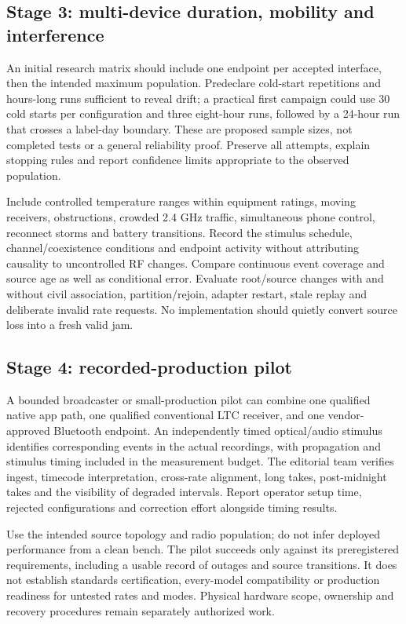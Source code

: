 \documentclass[11pt,letterpaper]{article}
\begin{document}
\subsection{Stage 3: multi-device duration, mobility and interference}
An initial research matrix should include one endpoint per accepted interface, then the intended maximum population. Predeclare cold-start repetitions and hours-long runs sufficient to reveal drift; a practical first campaign could use 30 cold starts per configuration and three eight-hour runs, followed by a 24-hour run that crosses a label-day boundary. These are proposed sample sizes, not completed tests or a general reliability proof. Preserve all attempts, explain stopping rules and report confidence limits appropriate to the observed population.

Include controlled temperature ranges within equipment ratings, moving receivers, obstructions, crowded 2.4 GHz traffic, simultaneous phone control, reconnect storms and battery transitions. Record the stimulus schedule, channel/coexistence conditions and endpoint activity without attributing causality to uncontrolled RF changes. Compare continuous event coverage and source age as well as conditional error. Evaluate root/source changes with and without civil association, partition/rejoin, adapter restart, stale replay and deliberate invalid rate requests. No implementation should quietly convert source loss into a fresh valid jam.

\subsection{Stage 4: recorded-production pilot}
A bounded broadcaster or small-production pilot can combine one qualified native app path, one qualified conventional LTC receiver, and one vendor-approved Bluetooth endpoint. An independently timed optical/audio stimulus identifies corresponding events in the actual recordings, with propagation and stimulus timing included in the measurement budget. The editorial team verifies ingest, timecode interpretation, cross-rate alignment, long takes, post-midnight takes and the visibility of degraded intervals. Report operator setup time, rejected configurations and correction effort alongside timing results.

Use the intended source topology and radio population; do not infer deployed performance from a clean bench. The pilot succeeds only against its preregistered requirements, including a usable record of outages and source transitions. It does not establish standards certification, every-model compatibility or production readiness for untested rates and modes. Physical hardware scope, ownership and recovery procedures remain separately authorized work.
\end{document}
